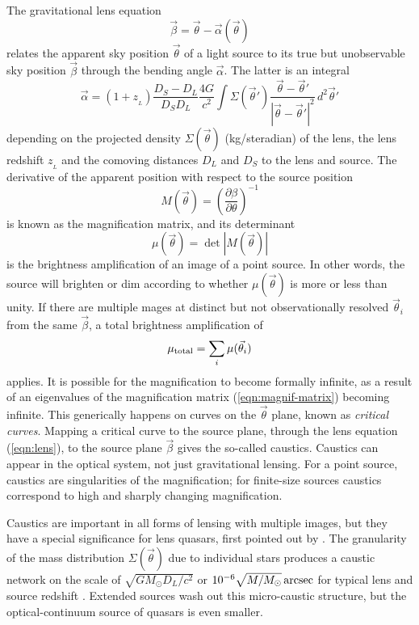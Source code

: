 \documentclass[usenatbib]{mn2e}
\begin{document}
The gravitational lens equation
\begin{equation}
\vec\beta = \vec\theta - \vec\alpha(\vec\theta)
\label{eqn:lens}
\end{equation}
relates the apparent sky position $\vec\theta$ of a light source to
its true but unobservable sky position $\vec\beta$ through the bending
angle $\vec\alpha$.  The latter is an integral 
\begin{equation}
\vec\alpha = (1+z_{_L})\frac{D_S-D_L}{D_SD_L} \frac{4G}{c^2}
\int \Sigma(\vec\theta')
\frac{\vec\theta-\vec\theta'}{|\vec\theta-\vec\theta'|^2}\,
d^2\vec\theta'
\label{eqn:alpha}
\end{equation}
depending on the projected density $\Sigma(\vec\theta)$ (kg/steradian)
of the lens, the lens redshift $z_{_L}$ and the comoving distances
$D_L$ and $D_S$ to the lens and source.  The derivative of the
apparent position with respect to the source position
\begin{equation}
M(\vec\theta) =
\left(\frac{\partial\beta}{\partial\theta}\right)^{-1}
\label{eqn:magnif-matrix}
\end{equation}
is known as the magnification matrix, and its determinant
\begin{equation}
\mu(\vec\theta) = \det|M(\vec\theta)|
\end{equation}
is the brightness amplification of an image of a point source.  In
other words, the source will brighten or dim according to whether
$\mu(\vec\theta)$ is more or less than unity.  If there are multiple
mages at distinct but not observationally resolved $\vec\theta_i$ from
the same $\vec\beta$, a total brightness amplification
of\begin{equation} \mu_{\rm total} = \sum_{i} \mu(\vec\theta_i)
\end{equation}
applies. It is possible for the magnification to become formally
infinite, as a result of an eigenvalues of the magnification matrix
(\ref{eqn:magnif-matrix}) becoming infinite.  This generically happens
on curves on the $\vec\theta$ plane, known as {\em critical curves}.
Mapping a critical curve to the source plane, through the lens
equation (\ref{eqn:lens}), to the source plane $\vec\beta$ gives the
so-called caustics.  Caustics can appear in the optical system, not just
gravitational lensing.  For a point source, caustics are singularities
of the magnification; for finite-size sources caustics correspond to
high and sharply changing magnification.

Caustics are important in all forms of lensing with multiple images,
but they have a special significance for lens quasars, first pointed
out by \cite{1979Natur.282..561C}.  The granularity of the mass
distribution $\Sigma(\vec\theta)$ due to individual stars produces a
caustic network on the scale of $\sqrt{GM_\odot D_L/c^2}$ or $10^{-6}
\sqrt{M/M_\odot}\rm\,arcsec$ for typical lens and source redshift
\citep{2001PASA...18..207W}.  Extended sources wash out this
micro-caustic structure, but the optical-continuum source of quasars
is even smaller.
\end{document}
